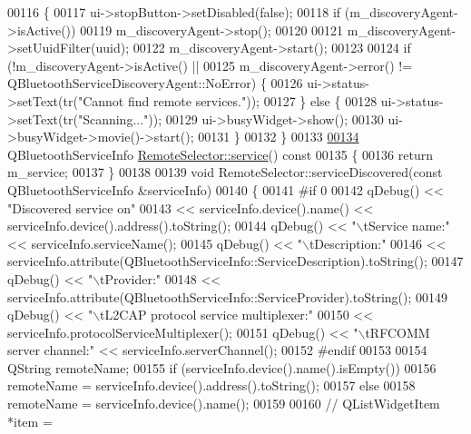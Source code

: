 \begin{DoxyCode}
00116 \{
00117     ui->stopButton->setDisabled(\textcolor{keyword}{false});
00118     \textcolor{keywordflow}{if} (m\_discoveryAgent->isActive())
00119         m\_discoveryAgent->stop();
00120 
00121     m\_discoveryAgent->setUuidFilter(uuid);
00122     m\_discoveryAgent->start();
00123 
00124     \textcolor{keywordflow}{if} (!m\_discoveryAgent->isActive() ||
00125             m\_discoveryAgent->error() != QBluetoothServiceDiscoveryAgent::NoError) \{
00126         ui->status->setText(tr(\textcolor{stringliteral}{"Cannot find remote services."}));
00127     \} \textcolor{keywordflow}{else} \{
00128         ui->status->setText(tr(\textcolor{stringliteral}{"Scanning..."}));
00129         ui->busyWidget->show();
00130         ui->busyWidget->movie()->start();
00131     \}
00132 \}
00133 
\hypertarget{remoteselector_8cpp_source.tex_l00134}{}\hyperlink{classRemoteSelector_ada5543d127d62eb91591d4d11294b8b2}{00134} QBluetoothServiceInfo \hyperlink{classRemoteSelector_ada5543d127d62eb91591d4d11294b8b2}{RemoteSelector::service}()\textcolor{keyword}{ const}
00135 \textcolor{keyword}{}\{
00136     \textcolor{keywordflow}{return} m\_service;
00137 \}
00138 
00139 \textcolor{keywordtype}{void} RemoteSelector::serviceDiscovered(\textcolor{keyword}{const} QBluetoothServiceInfo &serviceInfo)
00140 \{
00141 \textcolor{preprocessor}{#if 0}
00142     qDebug() << \textcolor{stringliteral}{"Discovered service on"}
00143              << serviceInfo.device().name() << serviceInfo.device().address().toString();
00144     qDebug() << \textcolor{stringliteral}{"\(\backslash\)tService name:"} << serviceInfo.serviceName();
00145     qDebug() << \textcolor{stringliteral}{"\(\backslash\)tDescription:"}
00146              << serviceInfo.attribute(QBluetoothServiceInfo::ServiceDescription).toString();
00147     qDebug() << \textcolor{stringliteral}{"\(\backslash\)tProvider:"}
00148              << serviceInfo.attribute(QBluetoothServiceInfo::ServiceProvider).toString();
00149     qDebug() << \textcolor{stringliteral}{"\(\backslash\)tL2CAP protocol service multiplexer:"}
00150              << serviceInfo.protocolServiceMultiplexer();
00151     qDebug() << \textcolor{stringliteral}{"\(\backslash\)tRFCOMM server channel:"} << serviceInfo.serverChannel();
00152 \textcolor{preprocessor}{#endif}
00153 
00154     QString remoteName;
00155     \textcolor{keywordflow}{if} (serviceInfo.device().name().isEmpty())
00156         remoteName = serviceInfo.device().address().toString();
00157     \textcolor{keywordflow}{else}
00158         remoteName = serviceInfo.device().name();
00159 
00160 \textcolor{comment}{//    QListWidgetItem *item =}

\end{DoxyCode}
